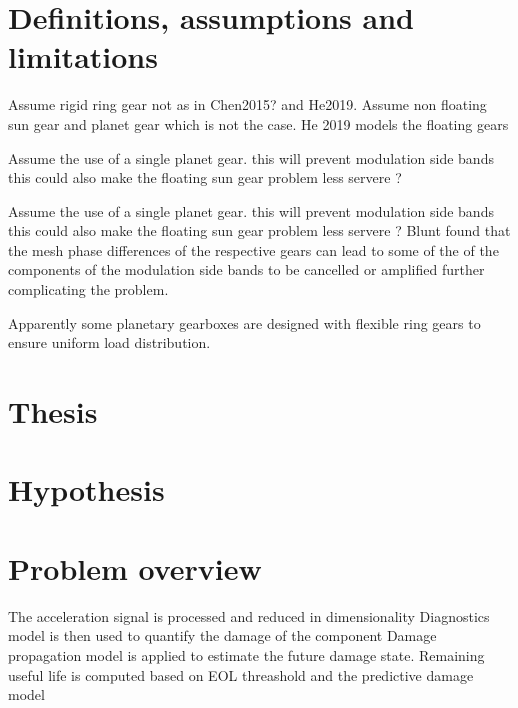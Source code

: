 \section{Definitions, assumptions and limitations}
Assume rigid ring gear not as in Chen2015? and He2019. Assume non floating sun gear and planet gear which is not the case. He 2019 models the floating gears


Assume the use of a single planet gear. this will prevent modulation side bands this could also make the floating sun gear problem less servere ?


Assume the use of a single planet gear. this will prevent modulation side bands this could also make the floating sun gear problem less servere ?
Blunt found that the mesh phase differences of the respective gears can lead to some of the of the components of the modulation side bands to be cancelled or amplified further complicating the problem.

Apparently some planetary gearboxes are designed with flexible ring gears to ensure uniform load distribution.
\section{Thesis}

\section{Hypothesis}

\section{Problem overview}
The acceleration signal is processed and reduced in dimensionality
Diagnostics model is then used to quantify the damage of the component 
Damage propagation model is applied to estimate the future damage state. 
Remaining useful life is computed based on EOL threashold and the predictive damage model 
\cite{Ellis2019}

